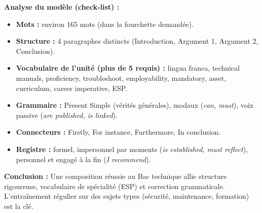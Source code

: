 \documentclass[11pt]{article}
\newcommand{\cle}[1]{{\popxbold\color{popdark}#1}}
\begin{document}
\begin{exoresolu}
\textbf{Analyse du modèle (check-list) :}
\begin{itemize}
    \item \textbf{Mots :} environ 165 mots (dans la fourchette demandée).
    \item \textbf{Structure :} 4 paragraphes distincts (Introduction, Argument 1, Argument 2, Conclusion).
    \item \textbf{Vocabulaire de l'unité (plus de 5 requis) :} \cle{lingua franca, technical manuals, proficiency, troubleshoot, employability, mandatory, asset, curriculum, career imperative, ESP}.
    \item \textbf{Grammaire :} Present Simple (vérités générales), modaux (\emph{can, must}), voix passive (\emph{are published, is linked}).
    \item \textbf{Connecteurs :} \cle{Firstly, For instance, Furthermore, In conclusion}.
    \item \textbf{Registre :} formel, impersonnel par moments (\emph{is established, must reflect}), personnel et engagé à la fin (\emph{I recommend}).
\end{itemize}

\textbf{Conclusion :} Une composition réussie au Bac technique allie structure rigoureuse, vocabulaire de spécialité (ESP) et correction grammaticale. L'entraînement régulier sur des sujets types (sécurité, maintenance, formation) est la clé.
\end{exoresolu}
\end{document}
